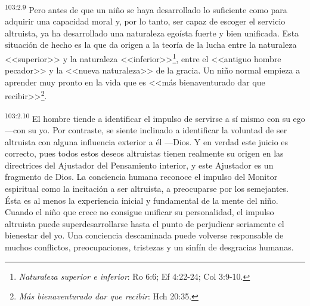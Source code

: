 \par
\textsuperscript{103:2.9} Pero antes de que un niño se haya desarrollado lo suficiente como para adquirir una capacidad moral y, por lo tanto, ser capaz de escoger el servicio altruista, ya ha desarrollado una naturaleza egoísta fuerte y bien unificada. Esta situación de hecho es la que da origen a la teoría de la lucha entre la naturaleza <<superior>> y la naturaleza <<inferior>>\footnote{\textit{Naturaleza superior e inferior}: Ro 6:6; Ef 4:22-24; Col 3:9-10.}, entre el <<antiguo hombre pecador>> y la <<nueva naturaleza>> de la gracia. Un niño normal empieza a aprender muy pronto en la vida que es <<más bienaventurado dar que recibir>>\footnote{\textit{Más bienaventurado dar que recibir}: Hch 20:35.}.

\par
\textsuperscript{103:2.10} El hombre tiende a identificar el impulso de servirse a sí mismo con su ego ---con su yo. Por contraste, se siente inclinado a identificar la voluntad de ser altruista con alguna influencia exterior a él ---Dios. Y en verdad este juicio es correcto, pues todos estos deseos altruistas tienen realmente su origen en las directrices del Ajustador del Pensamiento interior, y este Ajustador es un fragmento de Dios. La conciencia humana reconoce el impulso del Monitor espiritual como la incitación a ser altruista, a preocuparse por los semejantes. Ésta es al menos la experiencia inicial y fundamental de la mente del niño. Cuando el niño que crece no consigue unificar su personalidad, el impulso altruista puede superdesarrollarse hasta el punto de perjudicar seriamente el bienestar del yo. Una conciencia descaminada puede volverse responsable de muchos conflictos, preocupaciones, tristezas y un sinfín de desgracias humanas.

